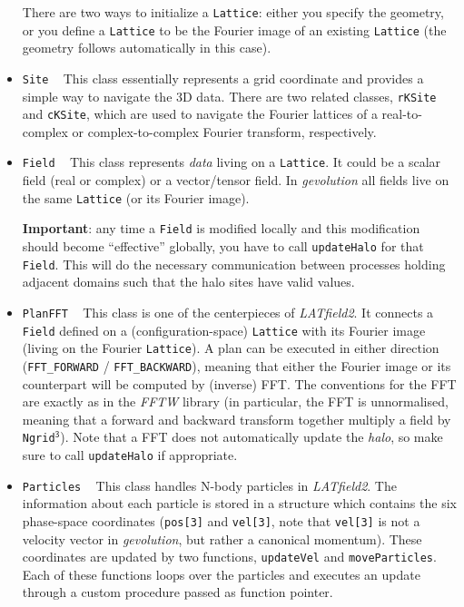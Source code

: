 \documentclass[a4paper,10pt]{article}
\begin{document}
\begin{itemize}
 There are two ways to initialize a \texttt{Lattice}: either you specify the geometry, or you define a \texttt{Lattice} to be the Fourier
 image of an existing \texttt{Lattice} (the geometry follows automatically in this case). 
 
 \item[] \hspace{-25pt}\texttt{Site} ~ This class essentially represents a grid coordinate and provides a simple way to navigate the 3D
 data. There are two related classes, \texttt{rKSite} and \texttt{cKSite}, which are used to navigate the Fourier lattices of a
 real-to-complex or complex-to-complex Fourier transform, respectively.
 
 \item[] \hspace{-25pt}\texttt{Field} ~ This class represents \textit{data} living on a \texttt{Lattice}. It could be a scalar field (real
 or complex) or a vector/tensor field. In \textit{gevolution} all fields live on the same \texttt{Lattice} (or its Fourier image).
 
 \textbf{Important}: any time a \texttt{Field} is modified locally and this modification should become ``effective'' globally, you have to
 call \texttt{updateHalo} for that \texttt{Field}. This will do the necessary communication between processes holding adjacent domains such
 that the halo sites have valid values.
 
 \item[] \hspace{-25pt}\texttt{PlanFFT} ~ This class is one of the centerpieces of \textit{LATfield2}. It connects a \texttt{Field} defined
 on a (configuration-space) \texttt{Lattice} with its Fourier image (living on the Fourier \texttt{Lattice}). A plan can be executed in
 either direction (\texttt{FFT\_FORWARD} / \texttt{FFT\_BACKWARD}), meaning that either the Fourier image or its counterpart will be
 computed by (inverse) FFT. The conventions for the FFT are exactly as in the \textit{FFTW} library (in particular, the FFT is unnormalised,
 meaning that a forward and backward transform together multiply a field by \texttt{Ngrid}$^\mathsf{3}$). Note that a FFT does not
 automatically update the \textit{halo}, so make sure to call \texttt{updateHalo} if appropriate.
 
 \item[] \hspace{-25pt}\texttt{Particles} ~ This class handles N-body particles in \textit{LATfield2}. The information about each particle
 is stored in a structure which contains the six phase-space coordinates (\texttt{pos[3]} and \texttt{vel[3]}, note that \texttt{vel[3]} is
 not a velocity vector in \textit{gevolution}, but rather a canonical momentum). These coordinates are updated by two functions,
 \texttt{updateVel} and \texttt{moveParticles}. Each of these functions loops over the particles and executes an update through a custom
 procedure passed as function pointer.
 

\end{itemize}
\end{document}
